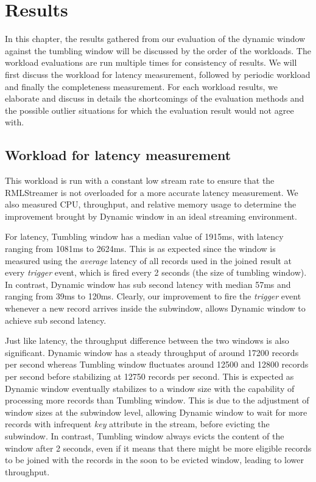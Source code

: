 \chapter{Results}%
\label{chap:Results}

In this chapter, the results gathered from our evaluation of the dynamic window against 
the tumbling window will be discussed by the order of the workloads. The workload 
evaluations are run multiple times for consistency of results. We will first 
discuss the workload for latency measurement, followed by periodic workload and 
finally the completeness measurement. For each workload results, we elaborate 
and discuss in details the shortcomings of the evaluation methods and the 
possible outlier situations for which the evaluation result would not agree with.



\section{Workload for latency measurement}%
\label{sec:Results Workload for latency measurement}

This workload is run with a constant low stream rate to ensure that 
the RMLStreamer is not overloaded for a more accurate latency measurement. We also measured 
CPU, throughput, and relative memory usage to determine the improvement brought by Dynamic window
in an ideal streaming environment.

For latency, Tumbling window has a median value of 1915ms, with latency ranging from 1081ms to 2624ms. 
This is as expected since the window is measured using the \emph{average} latency of all records used 
in the joined result at every \emph{trigger} event, which is fired every 2 seconds (the size of tumbling window).
In contrast, Dynamic window has sub second latency with median 57ms and ranging from 39ms to 120ms. Clearly, 
our improvement to fire the \emph{trigger} event whenever a new record arrives inside the subwindow, allows 
Dynamic window to achieve sub second latency. 

Just like latency, the throughput difference between the two windows is also significant. Dynamic window has a 
steady throughput of around 17200 records per second whereas Tumbling window fluctuates around 
12500 and 12800 records per second before stabilizing at 12750 records per second. This is expected as Dynamic 
window eventually stabilizes to a window size with the capability of processing more records than Tumbling window. This is 
due to the adjustment of window sizes at the subwindow level, allowing Dynamic window to wait for more records 
with infrequent \emph{key} attribute in the stream, before evicting the subwindow. In contrast, Tumbling window 
always evicts the content of the window after 2 seconds, even if it means that there might be more 
eligible records to be joined with the records in the soon to be evicted window, leading to lower throughput.  

